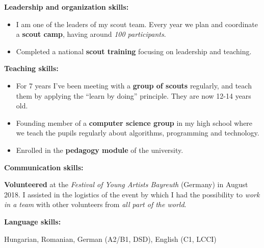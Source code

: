 \textbf{Leadership and organization skills:} 

\begin{itemize}
\item I am one of the leaders of my scout team. Every year we plan and coordinate a \textbf{scout camp}, having around \textit{100 participants}.

\item Completed a national \textbf{scout training} focusing on leadership and teaching.
\end{itemize}

\divider

\textbf{Teaching skills:} 

\begin{itemize}
 \item For 7 years I've been meeting with a \textbf{group of scouts} regularly, and teach them by applying the ``learn by doing'' principle. They are now 12-14 years old.
 
 \item Founding member of a \textbf{computer science group} in my high school where we teach the pupils regularly about algorithms, programming and technology.
 
 \item Enrolled in the \textbf{pedagogy module} of the university.
\end{itemize}



\divider

\textbf{Communication skills:} 

\textbf{Volunteered} at the \textit{Festival of Young Artists Bayreuth} (Germany) in August 2018. I assisted in the logistics of the event by which I had the possibility to \textit{work in a team} with other volunteers from \textit{all part of the world}.

\divider

\textbf{Language skills:} 

Hungarian, Romanian, German (A2/B1, DSD), English (C1, LCCI) 
